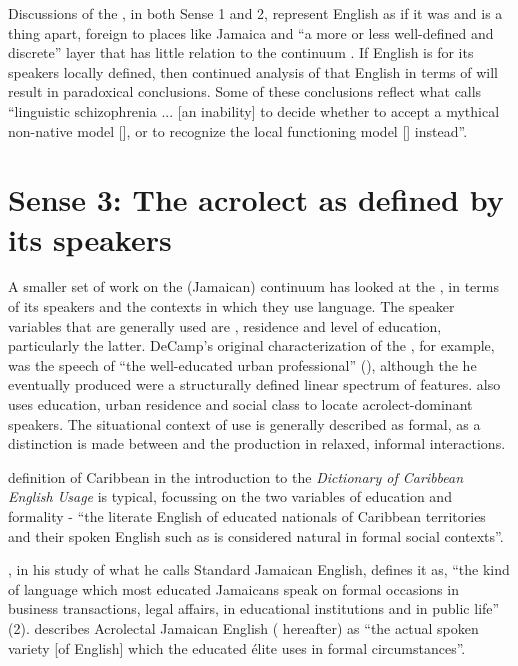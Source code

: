 Discussions of the , in both Sense 1 and 2, represent English as if it was and is a thing apart, foreign to places like Jamaica and “a more or less well-defined and discrete” layer that has little relation to the continuum \citep[241]{Winford1997}.  If English is for its speakers locally defined, then continued analysis of that English in terms of  will result in paradoxical conclusions.  Some of these conclusions reflect what \citet[50]{Kachru1982} calls “linguistic schizophrenia ... [an inability] to decide whether to accept a mythical non-native model [], or to recognize the local functioning model [] instead”. 

\section{Sense 3: The acrolect as defined by its speakers}\label{sec:1.4}%

A smaller set of work on the (Jamaican) continuum has looked at the , in terms of its speakers and the contexts in which they use language.  The speaker variables that are generally used are , residence and level of education, particularly the latter. DeCamp’s original characterization of the , for example, was the speech of  “the well-educated urban professional” (\citeyear[82]{DeCamp1961}), although the  he eventually produced were a structurally defined linear spectrum of features.  \citet{Beckford-Wassink1999a} also uses education, urban residence and social class to locate acrolect-dominant speakers.  The situational context of use is generally described as formal, as a distinction is made between  and the production in relaxed, informal interactions.

 definition of Caribbean  in the introduction to the \textit{Dictionary of Caribbean English Usage} is typical, focussing on the two variables of education and formality - “the literate English of educated nationals of Caribbean territories and their spoken English such as is considered natural in formal social contexts”.

\citet{Thaxter1977}, in his study of what he calls Standard Jamaican English, defines it as, “the kind of language which most educated Jamaicans speak on formal occasions in business transactions, legal affairs, in educational institutions and in public life” (2).  \citet[48,182]{Miller1987} describes Acrolectal Jamaican English ( hereafter) as “the actual spoken variety [of English] which the educated élite uses in formal circumstances”.

